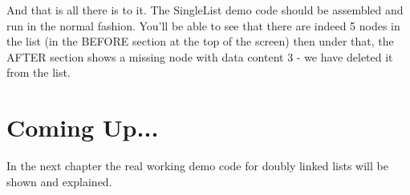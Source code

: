 And that is all there is to it. The SingleList demo code should be
    assembled and run in the normal fashion. You'll be able to see that there
    are indeed 5 nodes in the list (in the BEFORE section at the top of the
    screen) then under that, the AFTER section shows a missing node with data
    content 3 -{} we have deleted it from the list.

\section{Coming Up...}
\label{ch11-the-end}%

In the next chapter the real working demo code for doubly linked
    lists will be shown and explained.

